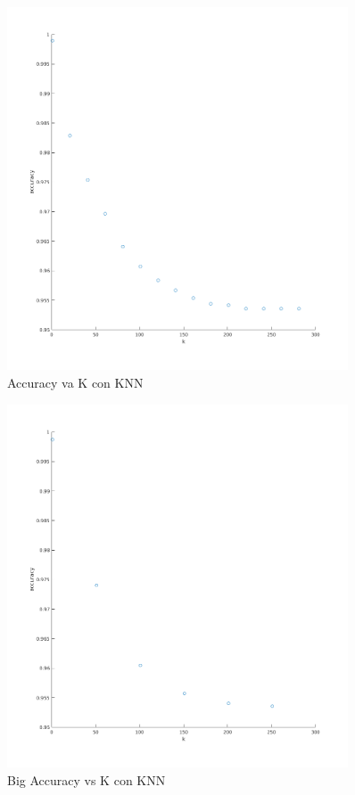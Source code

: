 \begin{figure}[H]
	\centering	\includegraphics[width=0.9\textwidth]{img/k_knn_accu.png}
	\caption{Accuracy va K con KNN}
	\label{fig:K vs Accuracy con KNN}
\end{figure}
\begin{figure}[H]
	\centering	\includegraphics[width=0.9\textwidth]{img/big_k_knn_accu.png}
	\caption{Big Accuracy vs K con KNN}
	\label{fig:Big K vs Accuracy con KNN}
\end{figure}






